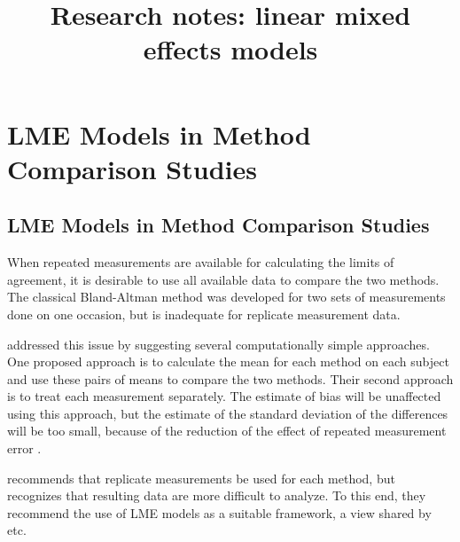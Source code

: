 \documentclass[12pt, a4paper]{report}
\title{Research notes: linear mixed effects models}
\author{ } \date{ }
\theoremstyle{plain}
\theoremstyle{definition}
\theoremstyle{remark}
\begin{document}
	\chapter{LME Models in Method Comparison Studies}
	
	\section{LME Models in Method Comparison Studies}
	
	When repeated measurements are available for calculating the limits of agreement, it is desirable to use all available data to compare the two methods. The classical Bland-Altman method was developed for two sets of measurements done on one occasion, but is inadequate for replicate measurement data.
	
	\citet{BA99} addressed this issue by suggesting several computationally simple approaches.  One proposed approach is to calculate the mean for each method on each subject and use these pairs of means to compare the two methods. Their second approach is to treat each measurement separately.
	The estimate of bias will be unaffected using this approach, but the estimate of the standard deviation of the differences will be too small, because of the reduction of the effect of repeated measurement error \citep{BXC2004,BXC2008}.
	
	\citet{BXC2008} recommends that replicate measurements be used for each method, but recognizes that resulting data are more difficult to analyze. To this end, they recommend the use of LME models as a suitable framework, a view shared by \citet{ARoy2009} etc.
	
	
	
	
\end{document}
